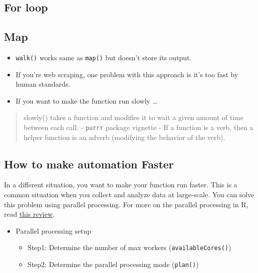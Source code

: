 \documentclass[
]{book}
\begin{document}
\hypertarget{for-loop-2}{%
\subsection{For loop}\label{for-loop-2}}

\hypertarget{map}{%
\subsection{Map}\label{map}}

\begin{itemize}
\item
  \texttt{walk()} works same as \texttt{map()} but doesn't store its output.
\item
  If you're web scraping, one problem with this approach is it's too fast by human standards.
\item
  If you want to make the function run slowly \ldots{}
\end{itemize}

\begin{quote}
slowly() takes a function and modifies it to wait a given amount of time between each call. - \texttt{purrr} package vignette
- If a function is a verb, then a helper function is an adverb (modifying the behavior of the verb).
\end{quote}

\hypertarget{how-to-make-automation-faster}{%
\subsection{How to make automation Faster}\label{how-to-make-automation-faster}}

In a different situation, you want to make your function run faster. This is a common situation when you collect and analyze data at large-scale. You can solve this problem using parallel processing. For more on the parallel processing in R, read \href{https://yxue-me.com/post/2019-05-12-a-glossary-of-parallel-computing-packages-in-r-2019/}{this review}.

\begin{itemize}
\item
  Parallel processing setup

  \begin{itemize}
  \item
    Step1: Determine the number of max workers (\texttt{availableCores()})
  \item
    Step2: Determine the parallel processing mode (\texttt{plan()})
  \end{itemize}
\end{itemize}
\end{document}
